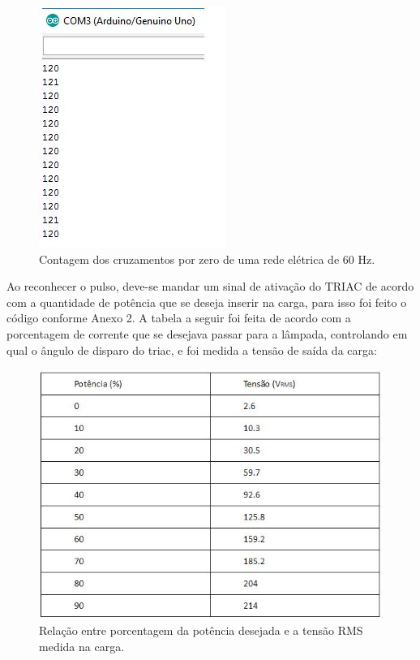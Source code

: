 \begin{figure}[H]
	\centering
	\label{resultado1}
	\includegraphics[keepaspectratio=true,scale=1.0]{figuras/resultado1.JPG}
	\caption{Contagem dos cruzamentos por zero de uma rede elétrica de 60 Hz.}
\end{figure}

Ao reconhecer o pulso, deve-se mandar um sinal de ativação do TRIAC de acordo com a quantidade de potência que se deseja inserir na carga, para isso foi feito o código conforme Anexo 2. A tabela a seguir foi feita de acordo com a porcentagem de corrente que se desejava passar para a lâmpada, controlando em qual o ângulo de disparo do triac, e foi medida a tensão de saída da carga:

\begin{figure}[H]
	\centering
	\label{tabpotencia}
	\includegraphics[keepaspectratio=true,scale=1.0]{figuras/tabpotencia.JPG}
	\caption{Relação entre porcentagem da potência desejada e a tensão RMS medida na carga.}
\end{figure}

